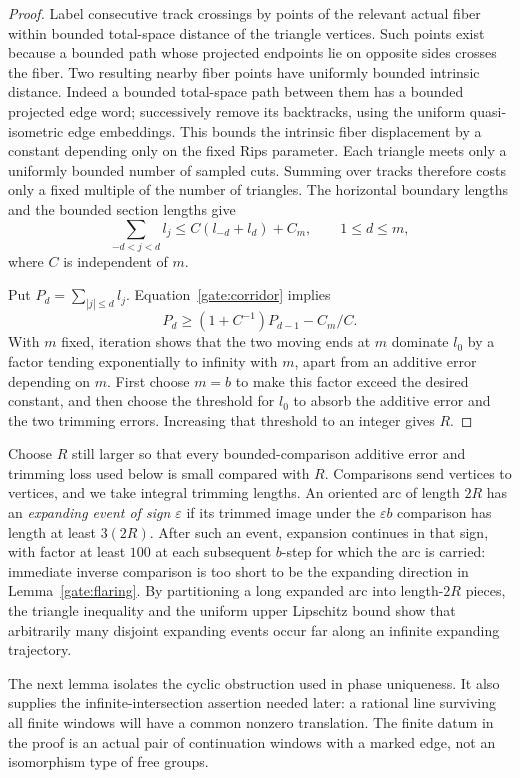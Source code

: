 \begin{proof}
Label consecutive track crossings by points of the relevant actual fiber
within bounded total-space distance of the triangle vertices.  Such points
exist because a bounded path whose projected endpoints lie on opposite
sides crosses the fiber.  Two resulting nearby fiber points have uniformly
bounded intrinsic distance.  Indeed a bounded total-space path between
them has a bounded projected edge word; successively remove its backtracks,
using the uniform quasi-isometric edge embeddings.  This bounds the
intrinsic fiber displacement by a constant depending only on the fixed
Rips parameter.  Each triangle meets only a uniformly bounded number of
sampled cuts.  Summing over tracks therefore costs only a fixed multiple
of the number of triangles.  The horizontal boundary lengths and the
bounded section lengths give
\begin{equation}\label{gate:corridor}
 \sum_{-d<j<d}l_j\le C(l_{-d}+l_d)+C_m,
 \qquad 1\le d\le m,
\end{equation}
where $C$ is independent of $m$.

Put $P_d=\sum_{|j|\le d}l_j$.  Equation~\eqref{gate:corridor} implies
\[
 P_d\ge (1+C^{-1})P_{d-1}-C_m/C.
\]
With $m$ fixed, iteration shows that the two moving ends at $m$ dominate
$l_0$ by a factor tending exponentially to infinity with $m$, apart from
an additive error depending on $m$.  First choose $m=b$ to make this
factor exceed the desired constant, and then choose the threshold for
$l_0$ to absorb the additive error and the two trimming errors.  Increasing
that threshold to an integer gives $R$.
\end{proof}

Choose $R$ still larger so that every bounded-comparison additive error
and trimming loss used below is small compared with $R$.  Comparisons send
vertices to vertices, and we take integral trimming lengths.  An oriented
arc of length $2R$ has an \emph{expanding event of sign $\varepsilon$}
if its trimmed image under the $\varepsilon b$ comparison has length at
least $3(2R)$.  After such an event, expansion continues in that sign,
with factor at least $100$ at each subsequent $b$-step for which the arc
is carried: immediate inverse comparison is too short to be the expanding
direction in Lemma~\ref{gate:flaring}.  By partitioning a long expanded
arc into length-$2R$ pieces, the triangle inequality and the uniform upper
Lipschitz bound show that arbitrarily many disjoint expanding events occur
far along an infinite expanding trajectory.

The next lemma isolates the cyclic obstruction used in phase uniqueness.
It also supplies the infinite-intersection assertion needed later: a
rational line surviving all finite windows will have a common nonzero
translation. The finite datum in the proof is an actual pair of
continuation windows with a marked edge, not an isomorphism type of
free groups.

